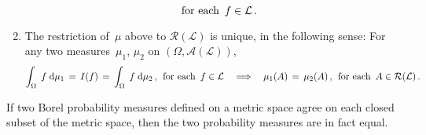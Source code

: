 \begin{theorem}
\begin{enumerate}
\begin{equation*}
	\quad\textnormal{for each \,$f \in \mathcal{L}$}\,.
	\end{equation*}
\item
	The restriction of \,$\mu$ above to $\mathcal{R}(\mathcal{L})$ is unique, in the following sense:\;
	For any two measures \,$\mu_{1}$, $\mu_{2}$ on $(\Omega,\mathcal{A}(\mathcal{L}))$,
	\begin{equation*}
		\int_{\Omega}\; f \;\textnormal{d}\mu_{1} \, = \, I(f) \, = \, \int_{\Omega}\; f \;\textnormal{d}\mu_{2}\,,
		\;\,\textnormal{for each \,$f \in \mathcal{L}$}
	\quad\Longrightarrow\quad
		\mu_{1}(A) \,=\, \mu_{2}(A)\,,
		\;\,\textnormal{for each \,$A \in \mathcal{R(\mathcal{L})}$}\,.
	\end{equation*}	
\end{enumerate} 
\end{theorem}


\begin{corollary}
\mbox{}\vskip 0.1cm
\noindent
If two Borel probability measures defined on a metric space agree on each closed subset of the metric space,
then the two probability measures are in fact equal.
\end{corollary}


\renewcommand{\theenumi}{\roman{enumi}}
\renewcommand{\labelenumi}{\textnormal{(\theenumi)}$\;\;$}

